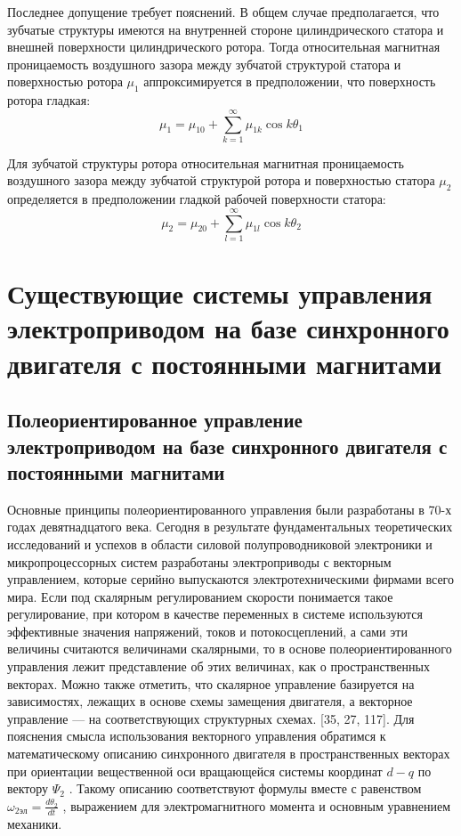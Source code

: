 Последнее допущение требует пояснений. В общем случае предполагается, что зубчатые структуры имеются на внутренней стороне цилиндрического статора и внешней поверхности цилиндрического ротора. Тогда относительная магнитная проницаемость воздушного зазора между зубчатой структурой
статора и поверхностью ротора $\mu_{1}$ аппроксимируется в предположении, что поверхность ротора гладкая:
\begin{equation}
\label{eq:mu1}
\mu_{1}=\mu_{10}+\sum_{k=1}^{\infty} \mu_{1 k} \cos k \theta_{1}
\end{equation}

Для зубчатой структуры ротора относительная магнитная проницаемость воздушного зазора между зубчатой структурой ротора и поверхностью статора $\mu_{2}$ определяется в предположении гладкой рабочей поверхности статора:
\begin{equation}
\label{eq:mu2}
\mu_{2}=\mu_{20}+\sum_{l=1}^{\infty} \mu_{1 l} \cos k \theta_{2}
\end{equation}

\section{Существующие системы управления электроприводом на базе синхронного двигателя с постоянными магнитами
} \label{sec:ch2/sec1}

\subsection{Полеориентированное управление электроприводом на базе синхронного двигателя с постоянными магнитами}
Основные принципы полеориентированного управления были разработаны в 70-х годах девятнадцатого века. Сегодня в результате фундаментальных теоретических исследований и успехов в области силовой полупроводниковой электроники и микропроцессорных систем разработаны электроприводы с векторным управлением, которые серийно выпускаются электротехническими фирмами всего мира. 
Если под скалярным регулированием скорости понимается такое регулирование, при котором в качестве переменных в системе используются эффективные значения напряжений, токов и потокосцеплений, а сами эти величины считаются величинами скалярными, то в основе полеориентированного управления лежит представление об этих величинах, как о пространственных векторах. Можно также отметить, что скалярное управление базируется на зависимостях, лежащих в основе схемы замещения двигателя, а векторное управление — на соответствующих структурных схемах. [35, 27, 117]. 
Для пояснения смысла использования векторного управления обратимся к математическому описанию синхронного двигателя в пространственных векторах при ориентации вещественной оси вращающейся системы координат $d-q$ по вектору ${\Psi }_{2}$ . Такому описанию соответствуют формулы  вместе с равенством $\omega_{2эл}=\frac{d \theta_{2}}{d t}$ , выражением для электромагнитного момента и основным уравнением механики. 

